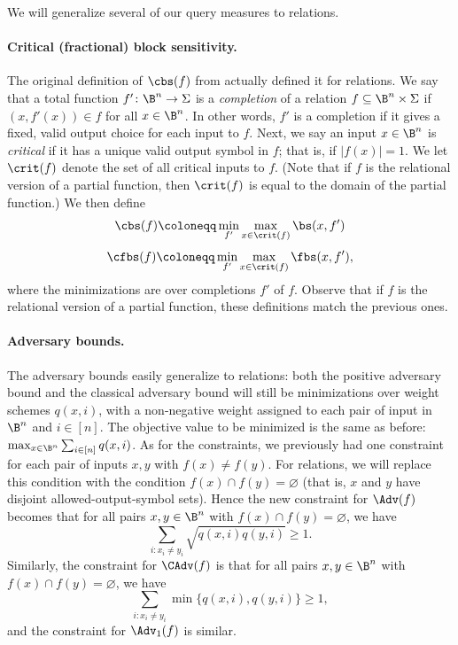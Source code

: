 We will generalize several of our query measures to relations.

\paragraph{Critical (fractional) block sensitivity.}
The original definition of $\cbs(f)$ from \cite{HN12} actually
defined it for relations.
We say that a total function $f'\colon\B^n\to\Sigma$
is a \emph{completion} of a relation $f\subseteq \B^n\times\Sigma$
if $(x,f'(x))\in f$ for all $x\in\B^n$. In other words,
$f'$ is a completion if it gives a fixed, valid
output choice for each input to $f$. Next, we say an input
$x\in\B^n$ is \emph{critical} if it has a unique valid
output symbol in $f$; that is, if $|f(x)|=1$.
We let $\crit(f)$ denote the set of all critical inputs
to $f$.
(Note that if $f$ is the relational version of a partial function,
then $\crit(f)$ is equal to the domain of the partial function.)
We then define
\[\cbs(f)\coloneqq \min_{f'}\max_{x\in\crit(f)}\bs(x,f')\]
\[\cfbs(f)\coloneqq \min_{f'}\max_{x\in\crit(f)}\fbs(x,f'),\]
where the minimizations are over completions $f'$ of $f$.
Observe that if $f$ is the relational version
of a partial function, these definitions
match the previous ones.

\paragraph{Adversary bounds.}
The adversary bounds easily generalize to relations:
both the positive adversary bound and the classical adversary
bound will still be minimizations over weight schemes
$q(x,i)$, with a non-negative weight assigned to each pair of
input in $\B^n$ and $i\in[n]$. The objective value to be
minimized is the same as before:
$\max_{x\in\B^n}\sum_{i\in[n]} q(x,i)$.
As for the constraints, we previously had one constraint
for each pair of inputs $x,y$ with $f(x)\ne f(y)$.
For relations, we will replace this condition with the condition
$f(x)\cap f(y)=\varnothing$ (that is, $x$ and $y$ have
disjoint allowed-output-symbol sets). Hence the new constraint
for $\Adv(f)$ becomes that for all pairs $x,y\in\B^n$
with $f(x)\cap f(y)=\varnothing$, we have
\[\sum_{i:x_i\ne y_i}\sqrt{q(x,i)q(y,i)}\ge 1.\]
Similarly, the constraint for $\CAdv(f)$ is that for all pairs
$x,y\in\B^n$ with $f(x)\cap f(y)=\varnothing$, we have
\[\sum_{i:x_i\ne y_i}\min\{q(x,i),q(y,i)\}\ge 1,\]
and the constraint for $\Adv_1(f)$ is similar.



